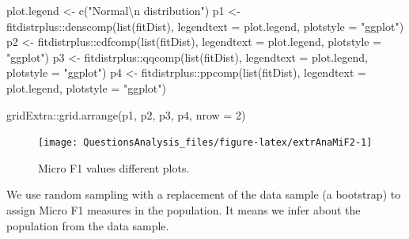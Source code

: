 \documentclass[
]{article}
\newenvironment{Shaded}{\begin{snugshade}}{\end{snugshade}}
\newcommand{\AttributeTok}[1]{\textcolor[rgb]{0.77,0.63,0.00}{#1}}
\newcommand{\DecValTok}[1]{\textcolor[rgb]{0.00,0.00,0.81}{#1}}
\newcommand{\FunctionTok}[1]{\textcolor[rgb]{0.00,0.00,0.00}{#1}}
\newcommand{\NormalTok}[1]{#1}
\newcommand{\OtherTok}[1]{\textcolor[rgb]{0.56,0.35,0.01}{#1}}
\newcommand{\SpecialCharTok}[1]{\textcolor[rgb]{0.00,0.00,0.00}{#1}}
\newcommand{\StringTok}[1]{\textcolor[rgb]{0.31,0.60,0.02}{#1}}
\begin{document}
\begin{Shaded}
\begin{Highlighting}[]
\NormalTok{plot.legend }\OtherTok{\textless{}{-}} \FunctionTok{c}\NormalTok{(}\StringTok{"Normal}\SpecialCharTok{\textbackslash{}n}\StringTok{ distribution"}\NormalTok{)}
\NormalTok{p1 }\OtherTok{\textless{}{-}}\NormalTok{ fitdistrplus}\SpecialCharTok{::}\FunctionTok{denscomp}\NormalTok{(}\FunctionTok{list}\NormalTok{(fitDist), }\AttributeTok{legendtext =}\NormalTok{ plot.legend, }\AttributeTok{plotstyle =} \StringTok{"ggplot"}\NormalTok{)}
\NormalTok{p2 }\OtherTok{\textless{}{-}}\NormalTok{ fitdistrplus}\SpecialCharTok{::}\FunctionTok{cdfcomp}\NormalTok{(}\FunctionTok{list}\NormalTok{(fitDist), }\AttributeTok{legendtext =}\NormalTok{ plot.legend, }\AttributeTok{plotstyle =} \StringTok{"ggplot"}\NormalTok{)}
\NormalTok{p3 }\OtherTok{\textless{}{-}}\NormalTok{ fitdistrplus}\SpecialCharTok{::}\FunctionTok{qqcomp}\NormalTok{(}\FunctionTok{list}\NormalTok{(fitDist), }\AttributeTok{legendtext =}\NormalTok{ plot.legend, }\AttributeTok{plotstyle =} \StringTok{"ggplot"}\NormalTok{)}
\NormalTok{p4 }\OtherTok{\textless{}{-}}\NormalTok{ fitdistrplus}\SpecialCharTok{::}\FunctionTok{ppcomp}\NormalTok{(}\FunctionTok{list}\NormalTok{(fitDist), }\AttributeTok{legendtext =}\NormalTok{ plot.legend, }\AttributeTok{plotstyle =} \StringTok{"ggplot"}\NormalTok{)}

\NormalTok{gridExtra}\SpecialCharTok{::}\FunctionTok{grid.arrange}\NormalTok{(p1, p2, p3, p4, }\AttributeTok{nrow =} \DecValTok{2}\NormalTok{)}
\end{Highlighting}
\end{Shaded}

\begin{figure}

{\centering \texttt{[image: QuestionsAnalysis\_files/figure-latex/extrAnaMiF2-1]} 

}

\caption{Micro F1 values different plots.}\label{fig:extrAnaMiF2}
\end{figure}

We use random sampling with a replacement of the data sample (a bootstrap) to assign Micro F1 measures in the population. It means we infer about the population from the data sample.

\begin{Shaded}
\end{Shaded}
\end{document}
